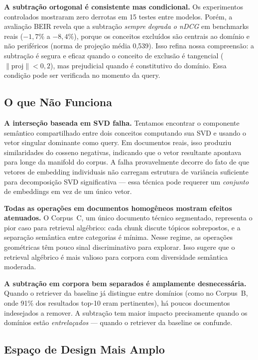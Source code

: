 \documentclass{article}
\begin{document}
\textbf{A subtração ortogonal é consistente mas condicional.} Os experimentos controlados mostraram zero derrotas em 15 testes entre modelos. Porém, a avaliação BEIR revela que a subtração \emph{sempre degrada o nDCG} em benchmarks reais ($-1{,}7\%$ a $-8{,}4\%$), porque os conceitos excluídos são centrais ao domínio e não periféricos (norma de projeção média 0,539). Isso refina nossa compreensão: a subtração é segura e eficaz quando o conceito de exclusão é tangencial ($\|\text{proj}\| < 0{,}2$), mas prejudicial quando é constitutivo do domínio. Essa condição pode ser verificada no momento da query.

\subsection{O que Não Funciona}

\textbf{A interseção baseada em SVD falha.} Tentamos encontrar o componente semântico compartilhado entre dois conceitos computando sua SVD e usando o vetor singular dominante como query. Em documentos reais, isso produziu similaridades do cosseno negativas, indicando que o vetor resultante apontava para longe da manifold do corpus. A falha provavelmente decorre do fato de que vetores de embedding individuais não carregam estrutura de variância suficiente para decomposição SVD significativa --- essa técnica pode requerer um \emph{conjunto} de embeddings em vez de um único vetor.

\textbf{Todas as operações em documentos homogêneos mostram efeitos atenuados.} O Corpus~C, um único documento técnico segmentado, representa o pior caso para retrieval algébrico: cada chunk discute tópicos sobrepostos, e a separação semântica entre categorias é mínima. Nesse regime, as operações geométricas têm pouco sinal discriminativo para explorar. Isso sugere que o retrieval algébrico é mais valioso para corpora com diversidade semântica moderada.

\textbf{A subtração em corpora bem separados é amplamente desnecessária.} Quando o retriever da baseline já distingue entre domínios (como no Corpus~B, onde 91\% dos resultados top-10 eram pertinentes), há poucos documentos indesejados a remover. A subtração tem maior impacto precisamente quando os domínios estão \emph{entrelaçados} --- quando o retriever da baseline os confunde.

\subsection{Espaço de Design Mais Amplo}
\end{document}
